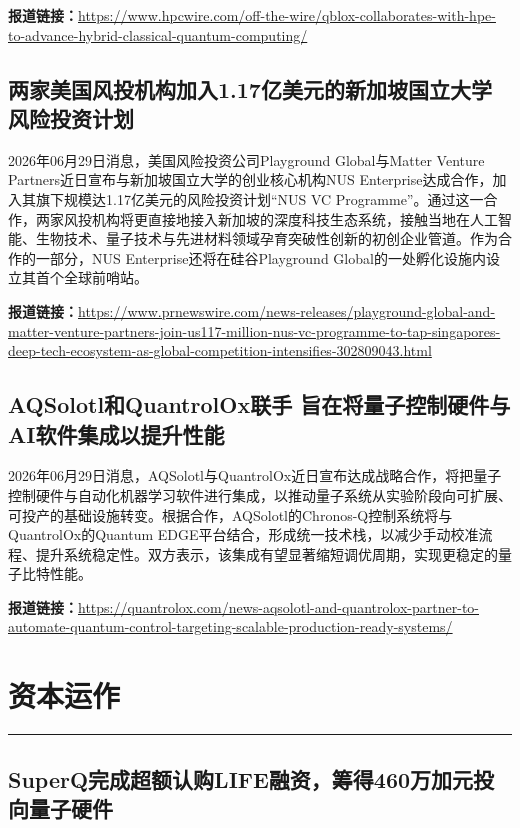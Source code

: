 \documentclass[12pt,a4paper]{ctexart}
\begin{document}
\noindent\textbf{报道链接：}\url{https://www.hpcwire.com/off-the-wire/qblox-collaborates-with-hpe-to-advance-hybrid-classical-quantum-computing/}

\subsection{ 两家美国风投机构加入1.17亿美元的新加坡国立大学风险投资计划 }

2026年06月29日消息，美国风险投资公司Playground Global与Matter Venture Partners近日宣布与新加坡国立大学的创业核心机构NUS Enterprise达成合作，加入其旗下规模达1.17亿美元的风险投资计划“NUS VC Programme”。通过这一合作，两家风投机构将更直接地接入新加坡的深度科技生态系统，接触当地在人工智能、生物技术、量子技术与先进材料领域孕育突破性创新的初创企业管道。作为合作的一部分，NUS Enterprise还将在硅谷Playground Global的一处孵化设施内设立其首个全球前哨站。

\noindent\textbf{报道链接：}\url{https://www.prnewswire.com/news-releases/playground-global-and-matter-venture-partners-join-us117-million-nus-vc-programme-to-tap-singapores-deep-tech-ecosystem-as-global-competition-intensifies-302809043.html}

\subsection{ AQSolotl和QuantrolOx联手 旨在将量子控制硬件与AI软件集成以提升性能 }

2026年06月29日消息，AQSolotl与QuantrolOx近日宣布达成战略合作，将把量子控制硬件与自动化机器学习软件进行集成，以推动量子系统从实验阶段向可扩展、可投产的基础设施转变。根据合作，AQSolotl的Chronos-Q控制系统将与QuantrolOx的Quantum EDGE平台结合，形成统一技术栈，以减少手动校准流程、提升系统稳定性。双方表示，该集成有望显著缩短调优周期，实现更稳定的量子比特性能。

\noindent\textbf{报道链接：}\url{https://quantrolox.com/news-aqsolotl-and-quantrolox-partner-to-automate-quantum-control-targeting-scalable-production-ready-systems/}


\newpage
\section{资本运作}
\vspace{-0.5em}
\noindent\rule{\linewidth}{1.5pt}

\subsection{ SuperQ完成超额认购LIFE融资，筹得460万加元投向量子硬件 }
\end{document}
